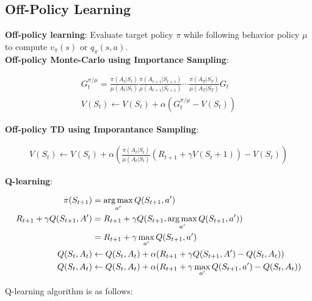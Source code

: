 \subsection{Off-Policy Learning}

\noindent \textbf{Off-policy learning}: Evaluate target policy $\pi$ while following behavior
policy $\mu$ to compute $v_\pi(s)$ or $q_\pi(s, a)$. \\

\noindent \textbf{Off-policy Monte-Carlo using Importance Sampling}:

\begin{gather*}
    G_t^{\pi / \mu} = \frac{\pi(A_t|S_t)}{\mu(A_t|S_t)} \frac{\pi(A_{t+1}|S_{t+1})}{\mu(A_{t+1}|S_{t+1})} \cdots \frac{\pi(A_{T}|S_{T})}{\mu(A_{T}|S_{T})} G_t \\
    V(S_t) \leftarrow V(S_t) + \alpha \left( G_t^{\pi / \mu} - V(S_t) \right)
\end{gather*}

\noindent \textbf{Off-policy TD using Imporantance Sampling}:

\begin{gather*}
    V(S_t) \leftarrow V(S_t) + \alpha \left( \frac{\pi(A_t|S_t)}{\mu(A_t|S_t)} (R_{t+1} + \gamma V(S_t+1)) - V(S_t) \right)
\end{gather*}

\noindent \textbf{Q-learning}:

\begin{align*}
    \pi(S_{t+1})                    & = \operatorname*{arg\,max}_{a'} Q(S_{t+1}, a')                                                             \\
    R_{t+1} + \gamma Q(S_{t+1}, A') & = R_{t+1} + \gamma Q(S_{t+1}, \operatorname*{arg\,max}_{a'} Q(S_{t+1}, a'))                                \\
                                    & = R_{t+1} + \gamma \max_{a'} Q(S_{t+1}, a')                                               \\
    Q(S_t, A_t)                     & \leftarrow Q(S_t, A_t) + \alpha (R_{t+1} + \gamma Q(S_{t+1}, A') - Q(S_t, A_t))           \\
    Q(S_t, A_t)                     & \leftarrow Q(S_t, A_t) + \alpha (R_{t+1} + \gamma \max_{a'} Q(S_{t+1}, a') - Q(S_t, A_t))
\end{align*}

\noindent Q-learning algorithm is as follows:

